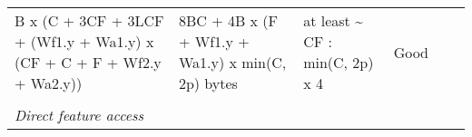 \documentclass[10pt,oneside]{memoir}
\begin{document}
\begin{longtable}[]{@{}llllll@{}}
\begin{minipage}[t]{0.10\columnwidth}
B x (C + 3CF + 3LCF + (Wf1.y + Wa1.y) x (CF + C + F + Wf2.y +
Wa2.y))\strut
\end{minipage} & \begin{minipage}[t]{0.13\columnwidth}\raggedright
8BC + 4B x (F + Wf1.y + Wa1.y) x min(C, 2p) bytes\strut
\end{minipage} & \begin{minipage}[t]{0.19\columnwidth}\raggedright
at least \textasciitilde{} CF : min(C, 2p) x 4\strut
\end{minipage} & \begin{minipage}[t]{0.11\columnwidth}\raggedright
Good\strut
\end{minipage} & \begin{minipage}[t]{0.12\columnwidth}\raggedright
\strut
\end{minipage}\tabularnewline
\begin{minipage}[t]{0.19\columnwidth}\raggedright
\strut
\end{minipage} & \begin{minipage}[t]{0.10\columnwidth}\raggedright
\strut
\end{minipage} & \begin{minipage}[t]{0.13\columnwidth}\raggedright
\strut
\end{minipage} & \begin{minipage}[t]{0.19\columnwidth}\raggedright
\strut
\end{minipage} & \begin{minipage}[t]{0.11\columnwidth}\raggedright
\strut
\end{minipage} & \begin{minipage}[t]{0.12\columnwidth}\raggedright
\strut
\end{minipage}\tabularnewline
\begin{minipage}[t]{0.19\columnwidth}\raggedright
\emph{Direct feature access}\strut
\end{minipage} & \begin{minipage}[t]{0.10\columnwidth}\raggedright
\strut
\end{minipage} & \begin{minipage}[t]{0.13\columnwidth}\raggedright
\strut
\end{minipage} & \begin{minipage}[t]{0.19\columnwidth}\raggedright
\strut
\end{minipage} & \begin{minipage}[t]{0.11\columnwidth}\raggedright
\strut
\end{minipage} & \begin{minipage}[t]{0.12\columnwidth}\raggedright

\end{minipage}
\end{longtable}
\end{document}
